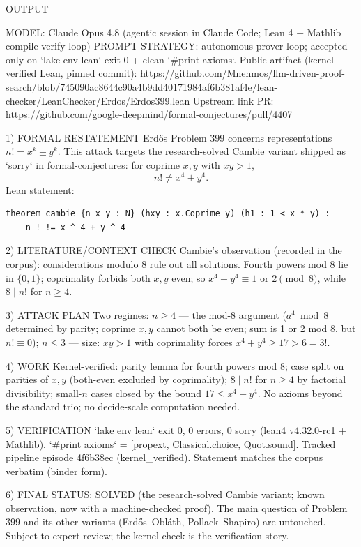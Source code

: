 
OUTPUT

MODEL: Claude Opus 4.8 (agentic session in Claude Code; Lean 4 + Mathlib compile-verify loop)
PROMPT STRATEGY: autonomous prover loop; accepted only on `lake env lean` exit 0 + clean
`#print axioms`. Public artifact (kernel-verified Lean, pinned commit):
https://github.com/Mnehmos/llm-driven-proof-search/blob/745090ac8644c90a4b9dd40171984af6b381af4e/lean-checker/LeanChecker/Erdos/Erdos399.lean
Upstream link PR: https://github.com/google-deepmind/formal-conjectures/pull/4407

1) FORMAL RESTATEMENT
Erdős Problem 399 concerns representations $n! = x^k \pm y^k$. This attack targets the
research-solved Cambie variant shipped as `sorry` in formal-conjectures: for coprime
$x, y$ with $xy > 1$,
\[
n! \ne x^4 + y^4 .
\]
Lean statement:
\begin{verbatim}
theorem cambie {n x y : N} (hxy : x.Coprime y) (h1 : 1 < x * y) :
    n ! != x ^ 4 + y ^ 4
\end{verbatim}

2) LITERATURE/CONTEXT CHECK
Cambie's observation (recorded in the corpus): considerations modulo 8 rule out all
solutions. Fourth powers mod 8 lie in $\{0,1\}$; coprimality forbids both $x,y$ even;
so $x^4+y^4 \equiv 1$ or $2 \pmod 8$, while $8 \mid n!$ for $n \ge 4$.

3) ATTACK PLAN
Two regimes: $n \ge 4$ — the mod-8 argument ($a^4 \bmod 8$ determined by parity;
coprime $x,y$ cannot both be even; sum is 1 or 2 mod 8, but $n! \equiv 0$);
$n \le 3$ — size: $xy > 1$ with coprimality forces $x^4 + y^4 \ge 17 > 6 = 3!$.

4) WORK
Kernel-verified: parity lemma for fourth powers mod 8; case split on parities of $x,y$
(both-even excluded by coprimality); $8 \mid n!$ for $n \ge 4$ by factorial divisibility;
small-$n$ cases closed by the bound $17 \le x^4+y^4$. No axioms beyond the standard trio;
no decide-scale computation needed.

5) VERIFICATION
`lake env lean` exit 0, 0 errors, 0 sorry (lean4 v4.32.0-rc1 + Mathlib).
`#print axioms` = [propext, Classical.choice, Quot.sound].
Tracked pipeline episode 4f6b38ec (kernel_verified). Statement matches the corpus
verbatim (binder form).

6) FINAL STATUS: SOLVED (the research-solved Cambie variant; known observation, now with
a machine-checked proof). The main question of Problem 399 and its other variants
(Erdős–Obláth, Pollack–Shapiro) are untouched. Subject to expert review; the kernel
check is the verification story.
